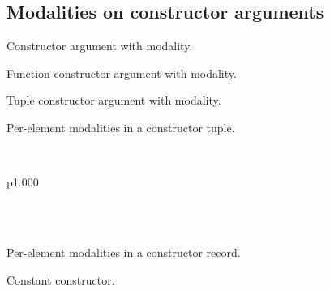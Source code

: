 \subsection{Modalities on constructor arguments\label{Oxcaml--modalities-on-constructor-arguments}}%
\label{Oxcaml--type-modalities_cstr}\begin{ocamlindent}\label{Oxcaml--type-modalities_cstr.A}%
\begin{ocamlindent}Constructor argument with  modality.\end{ocamlindent}%
\label{Oxcaml--type-modalities_cstr.B}%
\begin{ocamlindent}Function constructor argument with modality.\end{ocamlindent}%
\label{Oxcaml--type-modalities_cstr.C}%
\begin{ocamlindent}Tuple constructor argument with modality.\end{ocamlindent}%
\label{Oxcaml--type-modalities_cstr.D}%
\begin{ocamlindent}Per-element modalities in a constructor tuple.\end{ocamlindent}%
\\
\begin{ocamltabular}{p{1.000\textwidth}}\label{Oxcaml--type-modalities_cstr.x}\\
\label{Oxcaml--type-modalities_cstr.y}\\
\end{ocamltabular}%
\\
\ocamlcodefragment{\}}\label{Oxcaml--type-modalities_cstr.E}%
\begin{ocamlindent}Per-element modalities in a constructor record.\end{ocamlindent}%
\label{Oxcaml--type-modalities_cstr.F}%
\begin{ocamlindent}Constant constructor.\end{ocamlindent}%
\end{ocamlindent}%
